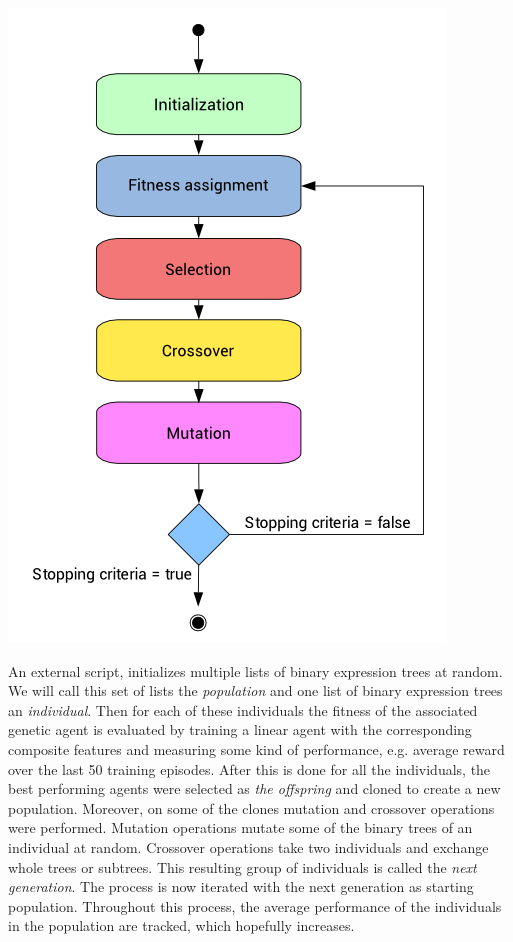\begin{minipage}{\linewidth}
\begin{center}
\includegraphics[scale=0.5]{graphics/genetic_algorithm.png}
\end{center}
\end{minipage}
\vspace{10pt}

An external script, initializes multiple lists of binary expression trees at random. We will call this set of lists the \emph{population} and one list of binary expression trees an \emph{individual}. Then for each of these individuals the fitness of the associated genetic agent is evaluated by training a linear agent with the corresponding composite features and measuring some kind of performance, e.g. average reward over the last 50 training episodes. After this is done for all the individuals, the best performing agents were selected as \emph{the offspring} and cloned to create a new population. Moreover, on some of the clones mutation and crossover operations were performed. Mutation operations mutate some of the binary trees of an individual at random. Crossover operations take two individuals and exchange whole trees or subtrees. This resulting group of individuals is called the \emph{next generation}. The process is now iterated with the next generation as starting population. Throughout this process, the average performance of the individuals in the population are tracked, which hopefully increases. \\

